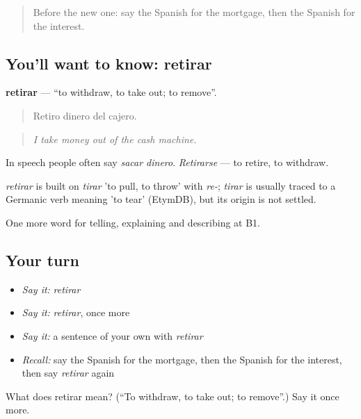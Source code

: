 \label{lesson:ES-C628-retirar}



\begin{quote}
Before the new one: say the Spanish for the mortgage, then the Spanish for the interest.
\end{quote}

\subsection*{You'll want to know: retirar}
\textbf{retirar} — \textquotedblleft{}to withdraw, to take out; to remove\textquotedblright{}.

\begin{quote}
Retiro dinero del cajero.
\end{quote}

\begin{quote}
\emph{I take money out of the cash machine.}
\end{quote}

In speech people often say \emph{sacar dinero}. \emph{Retirarse} — to retire, to withdraw.

\begin{cousinweb}
\emph{retirar} is built on \emph{tirar} 'to pull, to throw' with \emph{re-}; \emph{tirar} is usually traced to a Germanic verb meaning 'to tear' (EtymDB), but its origin is not settled.
\end{cousinweb}

\begin{grammarlens}[title={What you've built}]
One more word for telling, explaining and describing at B1.
\end{grammarlens}

\subsection*{Your turn}
\begin{itemize}
\raggedright
  \item \emph{Say it:} \emph{retirar}
  \item \emph{Say it:} \emph{retirar}, once more
  \item \emph{Say it:} a sentence of your own with \emph{retirar}
  \item \emph{Recall:} say the Spanish for the mortgage, then the Spanish for the interest, then say \emph{retirar} again
\end{itemize}

\begin{tcolorbox}[breakable,colback=teal!4,colframe=teal!35!black,title={Before you move on}]
What does retirar mean? (\textquotedblleft{}To withdraw, to take out; to remove\textquotedblright{}.) Say it once more.
\end{tcolorbox}
